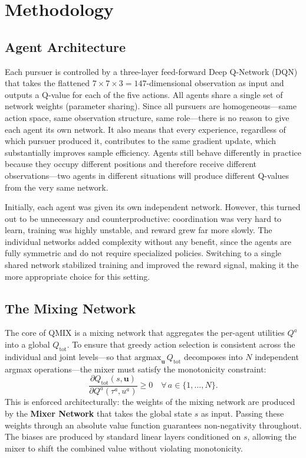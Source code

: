 \documentclass[sigconf,screen]{acmart}
\begin{document}
\section{Methodology}

\subsection{Agent Architecture}

Each pursuer is controlled by a three-layer feed-forward Deep Q-Network (DQN) that takes the flattened $7{\times}7{\times}3 = 147$-dimensional observation as input and outputs a Q-value for each of the five actions. All agents share a single set of network weights (parameter sharing). Since all pursuers are homogeneous---same action space, same observation structure, same role---there is no reason to give each agent its own network. It also means that every experience, regardless of which pursuer produced it, contributes to the same gradient update, which substantially improves sample efficiency. Agents still behave differently in practice because they occupy different positions and therefore receive different observations—two agents in different situations will produce different Q-values from the very same network.

Initially, each agent was given its own independent network. However, this turned out to be unnecessary and counterproductive: coordination was very hard to learn, training was highly unstable, and reward grew far more slowly. The individual networks added complexity without any benefit, since the agents are fully symmetric and do not require specialized policies. Switching to a single shared network stabilized training and improved the reward signal, making it the more appropriate choice for this setting.

\subsection{The Mixing Network}

The core of QMIX is a mixing network that aggregates the per-agent utilities $Q^a$ into a global $Q_\text{tot}$. To ensure that greedy action selection is consistent across the individual and joint levels—so that $\text{argmax}_\mathbf{u}\, Q_\text{tot}$ decomposes into $N$ independent argmax operations—the mixer must satisfy the monotonicity constraint:
\begin{equation}
    \frac{\partial Q_{\text{tot}}(s, \mathbf{u})}{\partial Q^a(\tau^a, u^a)} \ge 0 \quad \forall\, a \in \{1, \dots, N\}.
\end{equation}
This is enforced architecturally: the weights of the mixing network are produced by the \textbf{Mixer Network} that takes the global state $s$ as input. Passing these weights through an absolute value function guarantees non-negativity throughout. The biases are produced by standard linear layers conditioned on $s$, allowing the mixer to shift the combined value without violating monotonicity.
\end{document}
